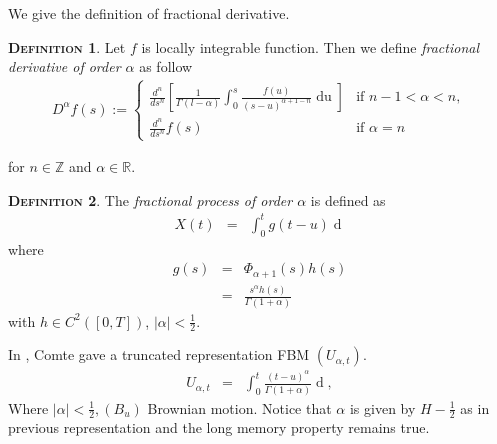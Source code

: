 \documentclass[a4paper, twoside, 11pt]{article}
\theoremstyle{definition}
\newtheorem{definition}{\scshape Definition}[section]
\begin{document}
We give the definition of fractional derivative.
\begin{definition}
Let $f$ is locally integrable function. Then we define \emph{fractional derivative of order $\alpha$} as follow
\begin{eqnarray}
  D^\alpha f(s) := \begin{cases} \frac{d^n}{ds^n}[\frac{1}{\Gamma(l-\alpha)}\int_0^s \frac{f(u)}{(s-u)^{\alpha + 1 - n}}\mathop{du}] &\mbox{if } n-1 < \alpha < n,\\
	\frac{d^n}{ds^n} f(s) & \mbox{if } \alpha=n
  \end{cases}
  \label{sec:frader}
\end{eqnarray}
\end{definition}
for $n \in \mathbb{Z}$ and $\alpha \in \mathbb{R} $.
\begin{definition}
  The \emph{fractional process of order $\alpha$}  is defined as
  \begin{eqnarray}
	X(t) &=&  \int_0^{t} g(t - u) \mathop{dB_u}
	\label{sec:frac}
  \end{eqnarray}
  where 
  \begin{eqnarray*}
	g(s) &=& \Phi_{\alpha+1}(s)h(s)\\
	&=& \frac{s^\alpha h(s)}{\Gamma(1+\alpha)}
  \end{eqnarray*}
  with $h \in C^2([0, T])$,  $|\alpha| < \frac{1}{2}$.
\end{definition}
In \cite{comte}, Comte gave a truncated representation FBM $(U_{\alpha,t})$.
\begin{eqnarray}
  U_{\alpha,t} &=& \int_0^t \frac{(t-u)^\alpha}{\Gamma(1+\alpha)}\mathop{dB_u}, 
  \label{<sec:cc1>}
\end{eqnarray}
Where $|\alpha| < \frac{1}{2}, (B_u)$ Brownian motion. Notice that $\alpha$ is given by $H-\frac{1}{2}$ as in previous representation and the long memory property remains true.
\end{document}
